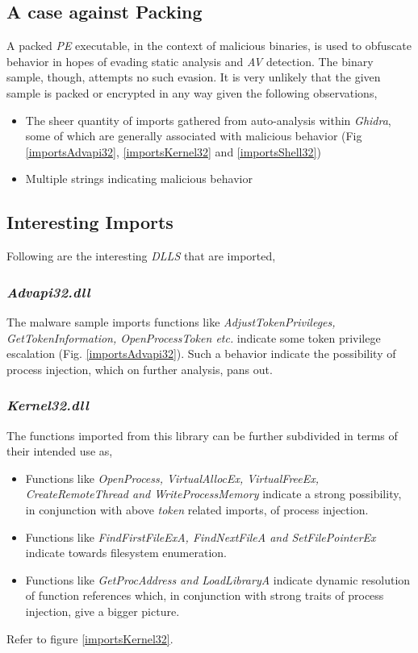 \documentclass[10pt,a4paper]{article}
\begin{document}
	\subsection{A case against Packing}
	A packed \textit{PE} executable, in the context of malicious binaries, is used to obfuscate behavior in hopes of evading static analysis and \textit{AV} detection.
	The binary sample, though, attempts no such evasion.
	It is very unlikely that the given sample is packed or encrypted in any way given the following observations,
	\begin{itemize}
	\vspace{-1em}
		\item The sheer quantity of imports gathered from auto-analysis within \textit{Ghidra}, some of which are generally associated with malicious behavior (Fig \ref{importsAdvapi32}, \ref{importsKernel32} and \ref{importsShell32})
		\item Multiple strings indicating malicious behavior 
	\end{itemize}

	\subsection{Interesting Imports}
	Following are the interesting \textit{DLLS} that are imported,
		\subsubsection*{\textit{Advapi32.dll}}
		\vspace{-1em}
		The malware sample imports functions like \textit{AdjustTokenPrivileges, GetTokenInformation, OpenProcessToken etc.} indicate some token privilege escalation (Fig. \ref{importsAdvapi32}).
		Such a behavior indicate the possibility of process injection, which on further analysis, pans out.

		\subsubsection*{\textit{Kernel32.dll}}
		\vspace{-1em}
		The functions imported from this library can be further subdivided in terms of their intended use as,
		\begin{itemize}
		\vspace{-1em}
			\item Functions like \textit{OpenProcess, VirtualAllocEx, VirtualFreeEx, CreateRemoteThread and WriteProcessMemory} indicate a strong possibility, in conjunction with above \textit{token} related imports, of process injection.
			\item Functions like \textit{FindFirstFileExA, FindNextFileA and SetFilePointerEx} indicate towards filesystem enumeration.
			\item Functions like \textit{GetProcAddress and LoadLibraryA} indicate dynamic resolution of function references  which, in conjunction with strong traits of process injection, give a bigger picture.
		\end{itemize}
		Refer to figure \ref{importsKernel32}.
\end{document}
